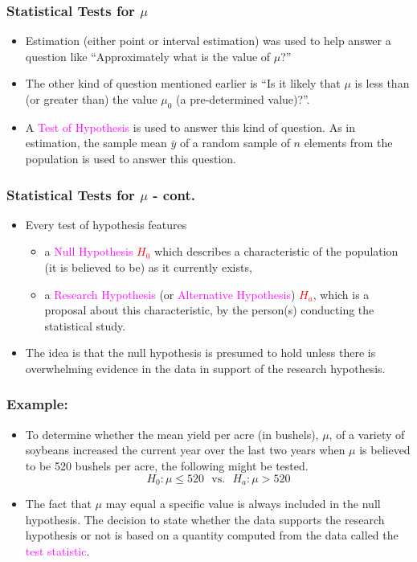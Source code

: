 \documentclass[xcolor=dvipsnames,12pt]{beamer}
\begin{document}
\begin{frame}
\frametitle{Statistical Tests for $\mu$}
\begin{itemize}
\item Estimation (either point or interval estimation) was used to
help answer a question like ``Approximately what is the value
of $\mu$?''
\item The other kind of question mentioned earlier is ``Is it likely
that $\mu$ is less than (or greater than) the value $\mu_0$ 
(a pre-determined value)?''.  
\item A \textcolor{magenta}{Test of Hypothesis} is used to answer this kind of question.
As in estimation, the sample mean $\bar{y}$ of a random sample of
$n$ elements from the population is used to answer this question.
\end{itemize}
\end{frame}



\begin{frame}
\frametitle{Statistical Tests for $\mu$ - cont.}
\begin{itemize}
\item Every test of hypothesis features 
\begin{itemize}
\item[(a)] a \textcolor{magenta}{Null Hypothesis}
\textcolor{red}{$H_0$} which describes a characteristic of the population  (it is believed
to be) as it currently exists,\\[.2in]

\item[(b)] a \textcolor{magenta}{Research Hypothesis} (or  \textcolor{magenta}{Alternative Hypothesis})
\textcolor{red}{$H_a$}, which is a  proposal about this  characteristic, by the person(s) 
conducting the statistical study. 
\end{itemize}
\item The idea is that the null hypothesis is presumed to hold unless
there is overwhelming evidence in the data in support of  the research hypothesis.
\end{itemize}
\end{frame}




\begin{frame}
\frametitle{Example:}
\begin{itemize}
\item To determine whether the mean yield per acre (in
bushels), $\mu$, of a variety of soybeans increased the current year over 
the last two years when $\mu$ is believed to be 520 bushels per acre,
the following might be tested.
 $$H_0: \mu \leq 520 \ \ \ \mbox{vs.}\ \ \ H_a: \mu > 520$$
\item The fact that $\mu$ may equal a specific value is always included
in the null hypothesis. The decision to state whether the data
supports the research hypothesis or not is based on a quantity 
computed from the data called the \textcolor{magenta}{test statistic}.
\end{itemize}
\end{frame}
\end{document}
